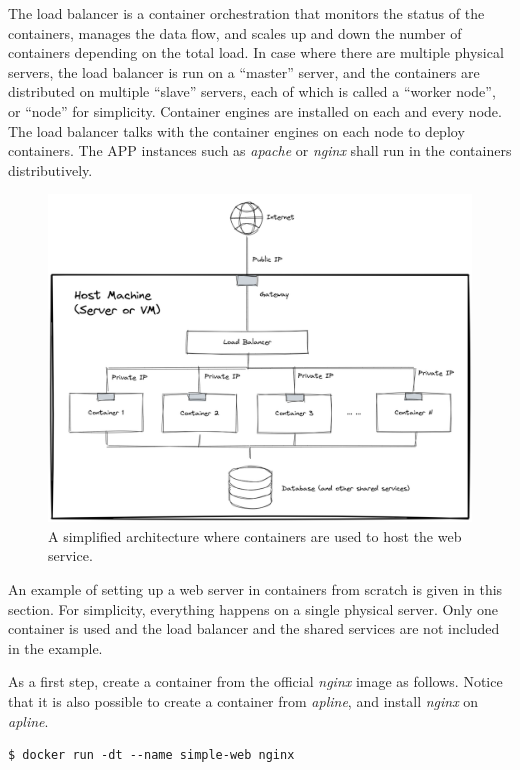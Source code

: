 The load balancer is a container orchestration that monitors the status of the containers, manages the data flow, and scales up and down the number of containers depending on the total load. In case where there are multiple physical servers, the load balancer is run on a ``master'' server, and the containers are distributed on multiple ``slave'' servers, each of which is called a ``worker node'', or ``node'' for simplicity. Container engines are installed on each and every node. The load balancer talks with the container engines on each node to deploy containers. The APP instances such as \textit{apache} or \textit{nginx} shall run in the containers distributively.
\begin{figure}
	\centering
	\includegraphics[width=350pt]{chapters/ch-virtualization-and-containerization/figures/containerwebserverarchitecture.png}
	\caption{A simplified architecture where containers are used to host the web service.} \label{ch:vac:fig:containerwebserverarchitecture}
\end{figure}

An example of setting up a web server in containers from scratch is given in this section. For simplicity, everything happens on a single physical server. Only one container is used and the load balancer and the shared services are not included in the example.

As a first step, create a container from the official \textit{nginx} image as follows. Notice that it is also possible to create a container from \textit{apline}, and install \textit{nginx} on \textit{apline}.
\begin{lstlisting}
$ docker run -dt --name simple-web nginx
\end{lstlisting}

